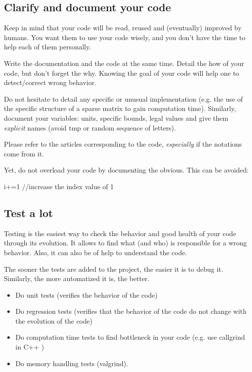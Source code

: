 
\subsection{Clarify and document your code}
Keep in mind that your code will be read, reused and (eventually) improved by humans.
You want them to use your code wisely, and you don't have the time to help each of them personally.

Write the documentation and the code at the same time. 
Detail the how of your code, but don't forget the why. 
Knowing the goal of your code will help one to detect/correct wrong behavior.

Do not hesitate to detail any specific or unusual implementation
(e.g. the use of the specific structure of a sparse matrix to gain computation time).
Similarly, document your variables: units, specific bounds, legal values and give them \textit{explicit} names (avoid tmp or random sequence of letters).	

Please refer to the articles corresponding to the code, \textit{especially} if the notations come from it.

Yet, do not overload your code by documenting the obvious. This can be avoided:\\
\begin{tt} i+=1 //increase the index value of 1\end{tt}

\subsection{Test a lot}
Testing is the easiest way to check the behavior and good health of your code through its evolution.
It allows to find what (and who) is responsible for a wrong behavior.
Also, it can also be of help to understand the code.

The sooner the tests are added to the project, the easier it is to debug it.
Similarly, the more automatized it is, the better.
\begin{itemize}[noitemsep,topsep=0pt,parsep=0pt,partopsep=0pt]
\item Do unit tests (verifies the behavior of the code)
\item Do regression tests (verifies that the behavior of the code do not change with the evolution of the code)
\item Do computation time tests to find bottleneck in your code (e.g. use callgrind in C++ )
\item Do memory handling tests (valgrind).
\end{itemize}

